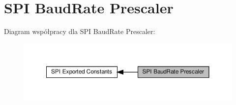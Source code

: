 \hypertarget{group___s_p_i___baud_rate___prescaler}{}\section{S\+PI Baud\+Rate Prescaler}
\label{group___s_p_i___baud_rate___prescaler}
Diagram współpracy dla S\+PI Baud\+Rate Prescaler\+:\nopagebreak
\begin{figure}[H]
\begin{center}
\leavevmode
\includegraphics[width=350pt]{group___s_p_i___baud_rate___prescaler}
\end{center}
\end{figure}
